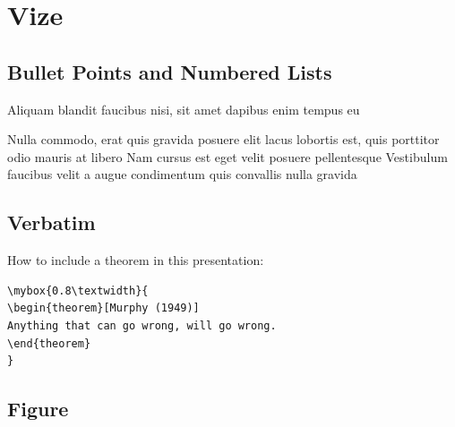 \documentclass[
paper=landscape,
paper=160mm:90mm, %
fontsize=11pt, %
pagesize, %
parskip=half-, %
]{scrartcl} %
\theoremstyle{mythmstyle} %
\newtheorem{theorem}{Theorem}[section] %
\newcommand*{\mybox}[2]{ %
\par\noindent
\begin{tikzpicture}[mynodestyle/.style={rectangle,draw=mygreen,thick,inner sep=2mm,text justified,top color=white,bottom color=white,above}]\node[mynodestyle,at={(0.5*#1+2mm+0.4pt,0)}]{ %
\begin{minipage}[t]{#1}
#2
\end{minipage}
};
\end{tikzpicture}
\par\vspace{-1.3em}}
\begin{document}
\section*{Vize}

\clearpage





\subsection*{Bullet Points and Numbered Lists}

\begin{outline}

\1 Aliquam blandit faucibus nisi, sit amet dapibus enim tempus eu

\2 Nulla commodo, erat quis gravida posuere
\1 elit lacus lobortis est, quis porttitor odio mauris at libero
\1 Nam cursus est eget velit posuere pellentesque
\1 Vestibulum faucibus velit a augue condimentum quis convallis nulla gravida

\end{outline}


\clearpage


\subsection*{Verbatim}

How to include a theorem in this presentation:
\begin{verbatim}
\mybox{0.8\textwidth}{
\begin{theorem}[Murphy (1949)]
Anything that can go wrong, will go wrong.
\end{theorem}
}
\end{verbatim}

\clearpage




\subsection*{Figure}
\end{document}
